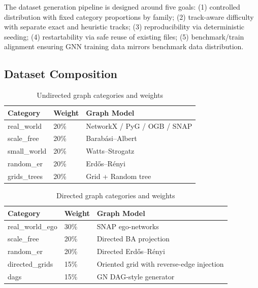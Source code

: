 \documentclass[10pt,a4paper]{report}
\theoremstyle{definition}
\begin{document}
The dataset generation pipeline is designed around five goals:
(1) controlled distribution with fixed category proportions by family;
(2) track-aware difficulty with separate exact and heuristic tracks;
(3) reproducibility via deterministic seeding;
(4) restartability via safe reuse of existing files;
(5) benchmark/train alignment ensuring GNN training data mirrors benchmark data distribution.

\subsection{Dataset Composition}

\begin{table}[H]
	\centering
	\caption{Undirected graph categories and weights}
	\label{tab:undirected_cats}
	\begin{tabular}{lll}
		\toprule
		\textbf{Category} & \textbf{Weight} & \textbf{Graph Model}                     \\
		\midrule
		real\_world       & 20\%            & NetworkX / PyG / OGB / SNAP              \\
		scale\_free       & 20\%            & Barab\'{a}si--Albert \cite{barabasi1999} \\
		small\_world      & 20\%            & Watts--Strogatz \cite{watts1998}         \\
		random\_er        & 20\%            & Erd\H{o}s--R\'{e}nyi \cite{erdos1959}    \\
		grids\_trees      & 20\%            & Grid + Random tree                       \\
		\bottomrule
	\end{tabular}
\end{table}

\begin{table}[H]
	\centering
	\caption{Directed graph categories and weights}
	\label{tab:directed_cats}
	\begin{tabular}{lll}
		\toprule
		\textbf{Category} & \textbf{Weight} & \textbf{Graph Model}                      \\
		\midrule
		real\_world\_ego  & 30\%            & SNAP ego-networks                         \\
		scale\_free       & 20\%            & Directed BA projection                    \\
		random\_er        & 20\%            & Directed Erd\H{o}s--R\'{e}nyi             \\
		directed\_grids   & 15\%            & Oriented grid with reverse-edge injection \\
		dags              & 15\%            & GN DAG-style generator                    \\
		\bottomrule
	\end{tabular}
\end{table}
\end{document}
